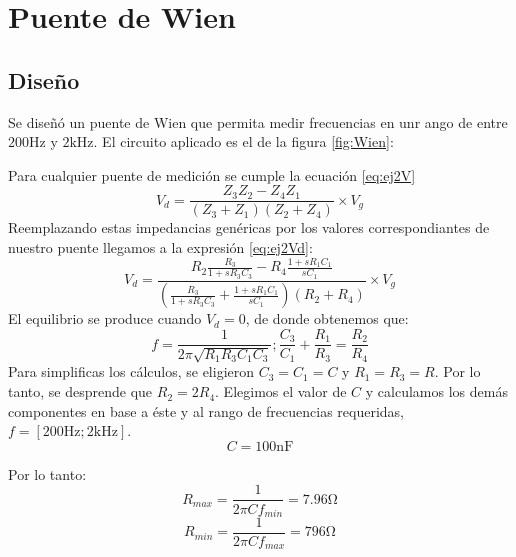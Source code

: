 \chapter{Puente de Wien}
\section{Diseño}
Se diseñó un puente de Wien que permita medir frecuencias en unr ango de entre
$200 \si{\hertz}$ y $2\si{\kilo\hertz}$. El circuito aplicado es el de la figura
\ref{fig:Wien}:
\begin{figure}[ht]
    \begin{center}
        
    \end{center}
\end{figure}

Para cualquier puente de medición se cumple la ecuación \ref{eq:ej2V}
\begin{equation}
    V_d=\frac{Z_3 Z_2 - Z_4 Z_1}{(Z_3 + Z_1)(Z_2 + Z_4)} \times V_g
    \label{eq:ej2V}
\end{equation}
Reemplazando estas impedancias genéricas por los valores correspondiantes de nuestro
puente llegamos a la expresión \ref{eq:ej2Vd}:
\begin{equation}
    V_d= \frac{R_2 \frac{R_3}{1+s R_3 C_3} - R_4 \frac{1+s R_1 C_1}{s C_1}}{(\frac{R_3}{1+s R_3 C_3} + \frac{1+s R_1 C_1}{s C_1}) (R_2 + R_4)} \times V_g
    \label{eq:ej2Vd}
\end{equation}
El equilibrio se produce cuando $V_d=0$, de donde obtenemos que:
\begin{equation}
    f = \frac{1}{2 \pi \sqrt{R_1 R_3 C_1 C_3}} ; \frac{C_3}{C_1}+\frac{R_1}{R_3}=\frac{R_2}{R_4}
\end{equation}
Para simplificas los cálculos, se eligieron $C_3=C_1=C$ y $R_1=R_3=R$. Por lo tanto,
se desprende que $R_2 = 2 R_4$.
Elegimos el valor de $C$ y calculamos los demás componentes en base a éste y al rango
de frecuencias requeridas, $f=[200 \si{\hertz};2\si{\kilo\hertz}]$.
\begin{equation}
    C = 100\si{\nano\farad}
\end{equation}


Por lo tanto:
\begin{equation}
    R_{max} = \frac{1}{2 \pi C f_{min}}= 7.96\si{\ohm}
\end{equation}
\begin{equation}
    R_{min} = \frac{1}{2 \pi C f_{max}}= 796\si{\ohm}
\end{equation}


